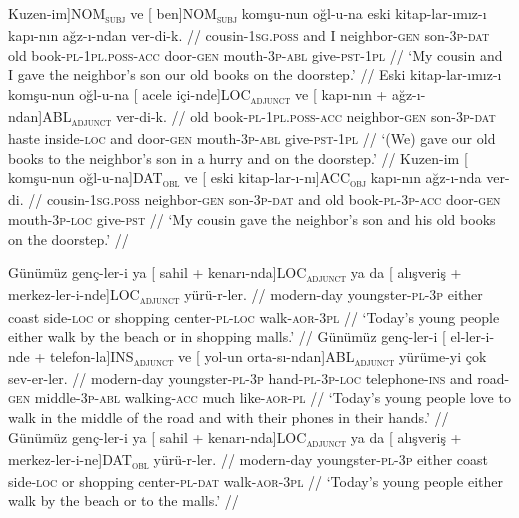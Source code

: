 \pex[exno=TS5,glspace=!1em,everygla={},everyglb={},aboveglbskip=-.15ex, interpartskip=15pt]
\label{TS5-case}
\a
\begingl
\gla {[} Kuzen-im{]}NOM\textsubscript{\textsc{subj}} ve {[} {ben]}NOM\textsubscript{\textsc{subj}} komşu-nun oğl-u-na eski kitap-lar-ımız-ı kapı-nın ağz-ı-ndan ver-di-k. //
\glb cousin-\textsc{1sg.poss} and I neighbor-\textsc{gen} son-\textsc{3p}-\textsc{dat} old book-\textsc{pl}-\textsc{1pl.poss}-\textsc{acc} door-\textsc{gen} mouth-\textsc{3p}-\textsc{abl} give-\textsc{pst}-\textsc{1pl} //
\glft `My cousin and I gave the neighbor's son our old books on the doorstep.' //
\endgl
\a
\begingl
\gla Eski kitap-lar-ımız-ı komşu-nun oğl-u-na {[} acele içi-nde{]}LOC\textsubscript{\textsc{adjunct}} ve {[} kapı-nın + ağz-ı-ndan{]}ABL\textsubscript{\textsc{adjunct}} ver-di-k. //
\glb old book-\textsc{pl}-\textsc{1pl.poss}-\textsc{acc} neighbor-\textsc{gen} son-\textsc{3p}-\textsc{dat} haste inside-\textsc{loc} and door-\textsc{gen} mouth-\textsc{3p}-\textsc{abl} give-\textsc{pst}-\textsc{1pl} //
\glft `(We) gave our old books to the neighbor's son in a hurry and on the doorstep.' //
\endgl
\a
\begingl
\gla Kuzen-im {[} komşu-nun oğl-u-na{]}DAT\textsubscript{\textsc{obl}} ve {[} eski kitap-lar-ı-nı{]}ACC\textsubscript{\textsc{obj}} kapı-nın ağz-ı-nda ver-di. //
\glb cousin-\textsc{1sg.poss} neighbor-\textsc{gen} son-\textsc{3p}-\textsc{dat} and old book-\textsc{pl}-\textsc{3p}-\textsc{acc} door-\textsc{gen} mouth-\textsc{3p}-\textsc{loc} give-\textsc{pst} //
\glft `My cousin gave the neighbor's son and his old books on the doorstep.' //
\endgl
\xe


\pex[exno=TS6,glspace=!1em,everygla={},everyglb={},aboveglbskip=-.15ex, interpartskip=15pt]
\label{TS6-case}
\a
\begingl
\gla Günümüz genç-ler-i ya {[} sahil + kenarı-nda{]}LOC\textsubscript{\textsc{adjunct}} {ya da} {[} alışveriş + merkez-ler-i-nde{]}LOC\textsubscript{\textsc{adjunct}} yürü-r-ler. //
\glb modern-day youngster-\textsc{pl}-\textsc{3p} either coast side-\textsc{loc} or shopping center-\textsc{pl}-\textsc{loc} walk-\textsc{aor}-\textsc{3pl} //
\glft `Today's young people either walk by the beach or in shopping malls.' //
\endgl
\a
\begingl
\gla Günümüz genç-ler-i {[} el-ler-i-nde + telefon-la{]}INS\textsubscript{\textsc{adjunct}} ve {[} yol-un orta-sı-ndan{]}ABL\textsubscript{\textsc{adjunct}} yürüme-yi çok sev-er-ler. //
\glb modern-day youngster-\textsc{pl}-\textsc{3p} hand-\textsc{pl}-\textsc{3p}-\textsc{loc} telephone-\textsc{ins} and road-\textsc{gen} middle-\textsc{3p}-\textsc{abl} walking-\textsc{acc} much like-\textsc{aor}-\textsc{pl} //
\glft `Today's young people love to walk in the middle of the road and with their phones in their hands.' //
\endgl
\a
\begingl
\gla Günümüz genç-ler-i ya {[} sahil + kenarı-nda{]}LOC\textsubscript{\textsc{adjunct}} {ya da} {[} alışveriş + merkez-ler-i-ne{]}DAT\textsubscript{\textsc{obl}} yürü-r-ler. //
\glb modern-day youngster-\textsc{pl}-\textsc{3p} either coast side-\textsc{loc} or shopping center-\textsc{pl}-\textsc{dat} walk-\textsc{aor}-\textsc{3pl} //
\glft `Today's young people either walk by the beach or to the malls.' //
\endgl
\xe

